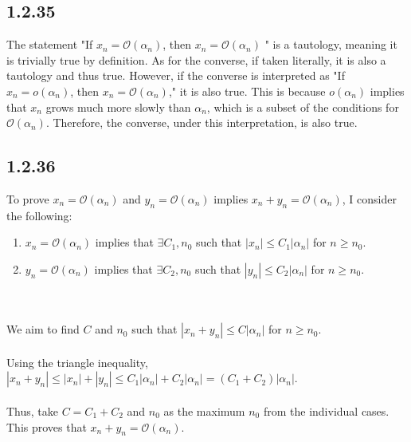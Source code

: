 \documentclass{article}
\begin{document}
\subsection*{1.2.35}
The statement "If $x_n=\mathcal{O}\left(\alpha_n\right)$, then $x_n=\mathcal{O}\left(\alpha_n\right)$ " is a tautology, meaning it is trivially true by definition.
As for the converse, if taken literally, it is also a tautology and thus true. However, if the converse is interpreted as "If $x_n=o\left(\alpha_n\right)$, then $x_n=\mathcal{O}\left(\alpha_n\right)$," it is also true. This is because $o\left(\alpha_n\right)$ implies that $x_n$ grows much more slowly than $\alpha_n$, which is a subset of the conditions for $\mathcal{O}\left(\alpha_n\right)$. Therefore, the converse, under this interpretation, is also true.

\subsection*{1.2.36}
To prove \( x_n = \mathcal{O}(\alpha_n) \) and \( y_n = \mathcal{O}(\alpha_n) \) implies \( x_n + y_n = \mathcal{O}(\alpha_n) \), I consider the following:

\begin{enumerate}
    \item \( x_n = \mathcal{O}(\alpha_n) \) implies that \( \exists C_1, n_0 \) such that \( |x_n| \leq C_1 |\alpha_n| \) for \( n \geq n_0 \).
    \item \( y_n = \mathcal{O}(\alpha_n) \) implies that \( \exists C_2, n_0 \) such that \( |y_n| \leq C_2 |\alpha_n| \) for \( n \geq n_0 \).
\end{enumerate}
\\
\\
We aim to find \( C \) and \( n_0 \) such that \( |x_n + y_n| \leq C |\alpha_n| \) for \( n \geq n_0 \).
\\
\\
Using the triangle inequality, \( |x_n + y_n| \leq |x_n| + |y_n| \leq C_1 |\alpha_n| + C_2 |\alpha_n| = (C_1 + C_2) |\alpha_n| \).
\\
\\
Thus, take \( C = C_1 + C_2 \) and \( n_0 \) as the maximum \( n_0 \) from the individual cases. This proves that \( x_n + y_n = \mathcal{O}(\alpha_n) \).
\end{document}
